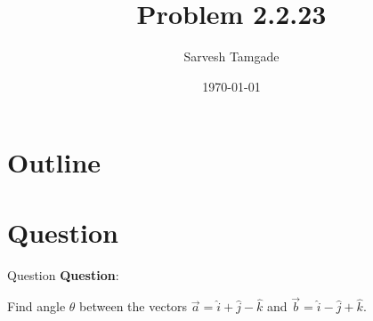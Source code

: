 \documentclass{beamer}
\title{Problem 2.2.23}
\author{Sarvesh Tamgade}
\date{\today}
\theoremstyle{remark}
\numberwithin{equation}{section}
\begin{document}
\begin{frame}
\titlepage
\end{frame}

\section*{Outline}
\begin{frame}
\tableofcontents
\end{frame}
\section{Question}
\begin{frame}{Question}
\textbf{Question}:


\noindent Find angle \(\theta\) between the vectors \(\vec{a} = \hat{i} + \hat{j} - \hat{k}\) and \(\vec{b} = \hat{i} - \hat{j} + \hat{k}\).
   

\end{frame}

    
\end{document}
